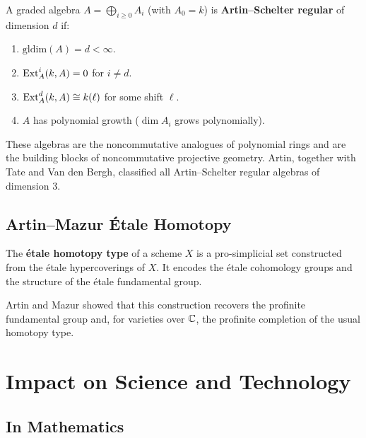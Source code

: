 \begin{definition}
A graded algebra $A = \bigoplus_{i \geq 0} A_i$ (with $A_0 = k$) is \textbf{Artin--Schelter regular} of dimension $d$ if:
\begin{enumerate}
    \item $\mathrm{gldim}(A) = d < \infty$.
    \item $\operatorname{Ext}^i_A(k, A) = 0$ for $i \neq d$.
    \item $\operatorname{Ext}^d_A(k, A) \cong k(\ell)$ for some shift $\ell$.
    \item $A$ has polynomial growth ($\dim A_i$ grows polynomially).
\end{enumerate}
\end{definition}

These algebras are the noncommutative analogues of polynomial rings and are the building blocks of noncommutative projective geometry. Artin, together with Tate and Van den Bergh, classified all Artin--Schelter regular algebras of dimension 3.

\subsection{Artin--Mazur \'Etale Homotopy}

\begin{definition}
The \textbf{\'etale homotopy type} of a scheme $X$ is a pro-simplicial set constructed from the \'etale hypercoverings of $X$. It encodes the \'etale cohomology groups and the structure of the \'etale fundamental group.
\end{definition}

Artin and Mazur showed that this construction recovers the profinite fundamental group and, for varieties over $\mathbb{C}$, the profinite completion of the usual homotopy type.

\section{Impact on Science and Technology}

\subsection{In Mathematics}

